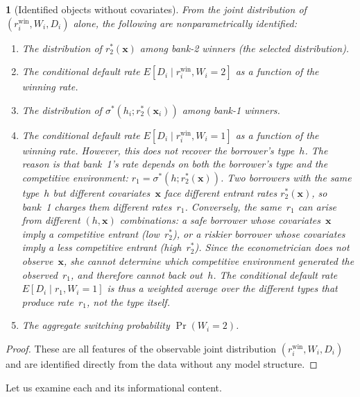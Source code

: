 \documentclass[12pt]{article}
\theoremstyle{plain}
\theoremstyle{plain}
\newtheorem{prop}[thm]{\protect\propositionname}
\theoremstyle{definition}  %
\theoremstyle{remark}  %
\providecommand{\propositionname}{Proposition}
\begin{document}
\begin{prop}[Identified objects without covariates]\label{prop:identified_objects}
From the joint distribution of $(r_i^{\text{win}}, W_i, D_i)$ alone, the following are nonparametrically identified:
\begin{enumerate}
    \item[(a)] The distribution of $r_2^*(\mathbf{x})$ among bank-2 winners (the selected distribution).
    \item[(b)] The conditional default rate $E[D_i \mid r_i^{\text{win}}, W_i = 2]$ as a function of the winning rate.
    \item[(c)] The distribution of $\sigma^*(h_i; r_2^*(\mathbf{x}_i))$ among bank-1 winners.
    \item[(d)] The conditional default rate $E[D_i \mid r_i^{\text{win}}, W_i = 1]$ as a function of the winning rate.  However, this does \emph{not} recover the borrower's type~$h$.  The reason is that bank~1's rate depends on both the borrower's type and the competitive environment: $r_1 = \sigma^*(h; r_2^*(\mathbf{x}))$.  Two borrowers with the \emph{same} type~$h$ but different covariates~$\mathbf{x}$ face different entrant rates $r_2^*(\mathbf{x})$, so bank~1 charges them different rates~$r_1$.  Conversely, the same~$r_1$ can arise from different $(h, \mathbf{x})$ combinations: a safe borrower whose covariates~$\mathbf{x}$ imply a competitive entrant (low~$r_2^*$), or a riskier borrower whose covariates imply a less competitive entrant (high~$r_2^*$).  Since the econometrician does not observe~$\mathbf{x}$, she cannot determine which competitive environment generated the observed~$r_1$, and therefore cannot back out~$h$.  The conditional default rate $E[D_i \mid r_1, W_i\!=\!1]$ is thus a weighted average over the different types that produce rate~$r_1$, not the type itself.
    \item[(e)] The aggregate switching probability $\Pr(W_i = 2)$.
\end{enumerate}
\end{prop}

\begin{proof}
These are all features of the observable joint distribution $(r_i^{\text{win}}, W_i, D_i)$ and are identified directly from the data without any model structure.
\end{proof}

Let us examine each and its informational content.
\end{document}
